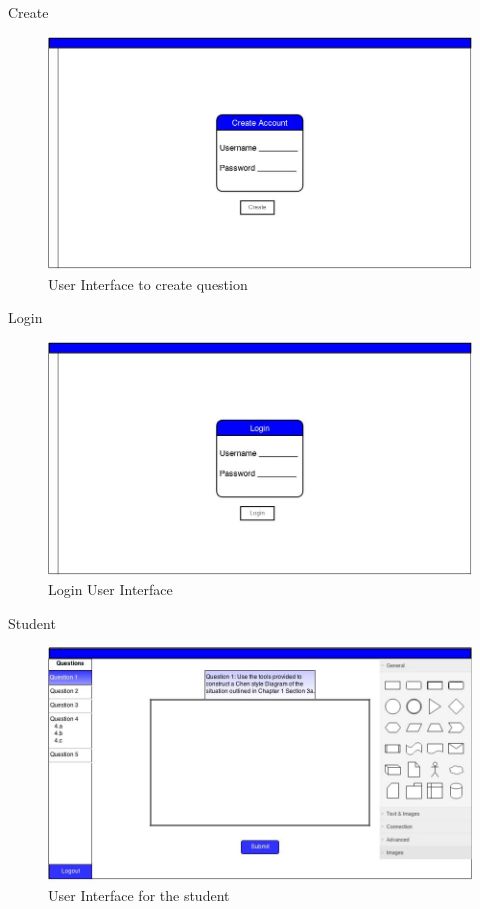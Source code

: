     \begin{section}{Create}
        \begin{figure}[h!]
                \centerline{\includegraphics[width=13cm]{UICreate.jpg}}
                \caption{User Interface to create question}
        \end{figure}
    \end{section}
    \newpage
    \begin{section}{Login}
        \begin{figure}[h!]
                \centerline{\includegraphics[width=13cm]{UILogin.jpg}}
                \caption{Login User Interface}
        \end{figure}
        \end{section}
        \newpage
        \begin{section}{Student}
        \begin{figure}[h!]
                \centerline{\includegraphics[width=13cm]{uistudent.jpg}}
                \caption{User Interface for the student}
        \end{figure}
    \end{section}




